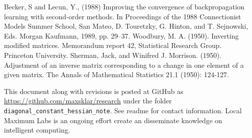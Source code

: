 \documentclass[twoside]{article}
\begin{document}

\begin{thebibliography}{20}
 Becker, S and Lecun, Y., (1988) Improving the convergence of backpropagation learning with second-order methods. In Proceedings of the 1988 Connectionist Models Summer School, San Mateo, D. Touretzky, G. Hinton, and T. Sejnowski, Eds. Morgan Kaufmann, 1989, pp. 29–37.
Woodbury, M. A. (1950). Inverting modified matrices. Memorandum report 42, Statistical Research Group. Princeton University.
Sherman, Jack, and Winifred J. Morrison. (1950). Adjustment of an inverse matrix corresponding to a change in one element of a given matrix. The Annals of Mathematical Statistics 21.1 (1950): 124-127.

\end{thebibliography}

This document along with revisions is posted at GitHub as \url{https://github.com/maxsklar/research} under the folder \texttt{diagonal\_constant\_hessian\_note}. See readme for contact information. Local Maximum Labs is an ongoing effort create an disseminate knowledge on intelligent computing.
\end{document}
